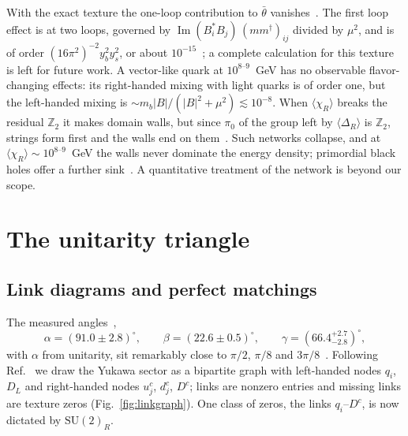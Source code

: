 \documentclass[submission, Phys]{SciPost}
\newcommand{\SU}{\mathrm{SU}}
\newcommand{\Z}{\mathbb{Z}}
\newcommand{\bt}{\bar\theta}
\newcommand{\vev}[1]{\langle #1\rangle}
\renewcommand{\Im}{\operatorname{Im}}
\begin{document}
With the exact texture the one-loop contribution to $\bt$
vanishes~\cite{BENTO199195}. The first loop effect is at two loops,
governed by $\Im(B_i^*B_j)\,(mm^\dagger)_{ij}$ divided by $\mu^2$, and is
of order $(16\pi^2)^{-2}y_b^2y_s^2$, or about
$10^{-15}$~\cite{Dine:2015jga}; a complete
calculation for this texture is left for future work. A vector-like
quark at $10^{8\text{--}9}$~GeV has no observable flavor-changing
effects: its right-handed mixing with light quarks is of order one, but
the left-handed mixing is $\sim m_b|B|/(|B|^2+\mu^2)\lesssim10^{-8}$.
When $\vev{\chi_R}$ breaks the residual $\Z_2$ it makes domain walls, but
since $\pi_0$ of the group left by $\vev{\Delta_R}$ is $\Z_2$, strings form
first and the walls end on them~\cite{kibble_1982:PRD}. Such networks
collapse, and at $\vev{\chi_R}\sim10^{8\text{--}9}$~GeV the walls never
dominate the energy density; primordial black holes offer a further
sink~\cite{Stojkovic:2005zh}. A quantitative treatment of the network
is beyond our scope.

\section{The unitarity triangle}
\label{sec:flavor}

\subsection{Link diagrams and perfect matchings}

The measured angles~\cite{ParticleDataGroup:2024cfk,UTfit:2022hsi},
\begin{equation}
  \alpha=(91.0\pm2.8)^\circ,\qquad
  \beta=(22.6\pm0.5)^\circ,\qquad
  \gamma=(66.4^{+2.7}_{-2.8})^\circ,
  \label{eq:UTangles}
\end{equation}
with $\alpha$ from unitarity, sit remarkably close to $\pi/2$, $\pi/8$
and $3\pi/8$~\cite{Arkani-Hamed:2026uos}.
Following Ref.~\cite{Arkani-Hamed:2026uos} we draw the Yukawa sector as
a bipartite graph with left-handed nodes $q_i$, $D_L$ and right-handed
nodes $u^c_j$, $d^c_j$, $D^c$; links are nonzero entries and missing
links are texture zeros (Fig.~\ref{fig:linkgraph}). One class of zeros,
the links $q_i$--$D^c$, is now dictated by $\SU(2)_R$.
\end{document}
